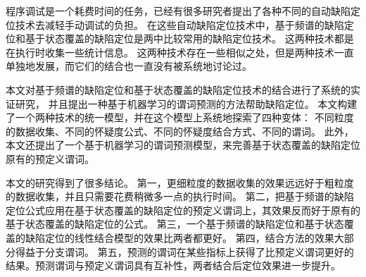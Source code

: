 
\begin{cabstract}

程序调试是一个耗费时间的任务，已经有很多研究者提出了各种不同的自动缺陷定位技术去减轻手动调试的负担。
在这些自动缺陷定位技术中，基于频谱的缺陷定位和基于状态覆盖的缺陷定位是两中比较常用的缺陷定位技术。
这两种技术都是在执行时收集一些统计信息。
这两种技术存在一些相似之处，但是两种技术一直单独地发展，而它们的结合也一直没有被系统地讨论过。

本文对基于频谱的缺陷定位和基于状态覆盖的缺陷定位技术的结合进行了系统的实证研究，
并且提出一种基于机器学习的谓词预测的方法帮助缺陷定位。
本文构建了一个两种技术的统一模型，并在这个模型上系统地探索了四种变体：
不同粒度的数据收集、不同的怀疑度公式、不同的怀疑度结合方式、不同的谓词。
此外，本文还提出了一个基于机器学习的谓词预测模型，来完善基于状态覆盖的缺陷定位原有的预定义谓词。

本文的研究得到了很多结论。
第一，更细粒度的数据收集的效果远远好于粗粒度的数据收集，并且只需要花费稍微多一点的执行时间。
第二，把基于频谱的缺陷定位公式应用在基于状态覆盖的缺陷定位的预定义谓词上，其效果反而好于原有的基于状态覆盖的缺陷定位的公式。
第三，一个基于频谱的缺陷定位和基于状态覆盖的缺陷定位的线性结合模型的效果比两者都更好。
第四，结合方法的效果大部分得益于分支谓词。
第五，预测的谓词在某些指标上获得了比预定义谓词更好的结果。预测谓词与预定义谓词具有互补性，两者结合后定位效果进一步提升。

\end{cabstract}

